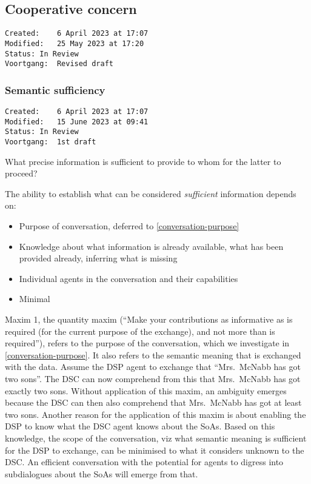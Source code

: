\documentclass[sort&compress,preprint,3p,authoryear,twocolumn]{elsarticle}
\providecommand{\tightlist}{%
  \setlength{\itemsep}{0pt}\setlength{\parskip}{0pt}}
\theoremstyle{break}			%
\begin{document}
\subsection{Cooperative concern}\label{cooperative-concern}

\begin{verbatim}
Created:    6 April 2023 at 17:07
Modified:   25 May 2023 at 17:20
Status: In Review
Voortgang:  Revised draft
\end{verbatim}

\subsubsection{Semantic sufficiency}\label{semantic-sufficiency}

\begin{verbatim}
Created:    6 April 2023 at 17:07
Modified:   15 June 2023 at 09:41
Status: In Review
Voortgang:  1st draft
\end{verbatim}

What precise information is sufficient to provide to whom for the latter
to proceed?

The ability to establish what can be considered \emph{sufficient}
information depends on:

\begin{itemize}
\tightlist
\item
  Purpose of conversation, deferred to \cref{conversation-purpose}
\item
  Knowledge about what information is already available, what has been
  provided already, inferring what is missing
\item
  Individual agents in the conversation and their capabilities
\item
  Minimal
\end{itemize}

Maxim 1, the quantity maxim (``Make your contributions as informative as
is required (for the current purpose of the exchange), and not more than
is required''), refers to the purpose of the conversation, which we
investigate in \cref{conversation-purpose}. It also refers to the
semantic meaning that is exchanged with the data. Assume the DSP agent
to exchange that ``Mrs.~McNabb has got two sons''. The DSC can now
comprehend from this that Mrs.~McNabb has got exactly two sons. Without
application of this maxim, an ambiguity emerges because the DSC can then
also comprehend that Mrs.~McNabb has got at least two sons. Another
reason for the application of this maxim is about enabling the DSP to
know what the DSC agent knows about the SoAs. Based on this knowledge,
the scope of the conversation, viz what semantic meaning is sufficient
for the DSP to exchange, can be minimised to what it considers unknown
to the DSC. An efficient conversation \citep{Diggelen:2007vd} with the
potential for agents to digress into subdialogues about the SoAs
\citep{Engelmann2023} will emerge from that.
\end{document}
